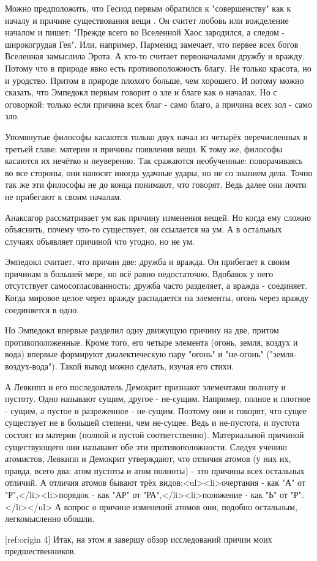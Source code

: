 \documentclass{article}
\begin{document}
Можно предположить, что Гесиод первым обратился к "совершенству" как к началу и причине существования вещи
\footnotemark[1]
. Он считет любовь или вожделение началом и пишет: "Прежде всего во Вселенной Хаос зародился, а следом - широкогрудая Гея". Или, например, Парменид замечает, что первее всех богов Вселенная замыслила Эрота. А кто-то считает первоначалами дружбу и вражду. Потому что в природе явно есть противоположность благу. Не только красота, но и уродство. Притом в природе плохого больше, чем хорошего. И потому можно сказать, что Эмпедокл первым говорит о зле и благе как о началах. Но с оговоркой: только если причина всех благ - само благо, а причина всех зол - само зло.

Упомянутые философы касаются только двух начал из четырёх перечисленных в третьей главе: материи и причины появления вещи. К тому же, философы касаются их нечётко и неуверенно. Так сражаются необученные: поворачиваясь во все стороны, они наносят иногда удачные удары, но не со знанием дела. Точно так же эти философы не до конца понимают, что говорят. Ведь далее они почти не прибегают к своим началам.

Анаксагор рассматривает ум как причину изменения вещей. Но когда ему сложно объяснить, почему что-то существует, он ссылается на ум. А в остальных случаях объявляет причиной что угодно, но не ум.

Эмпедокл считает, что причин две: дружба и вражда.
\footnotemark[2]
Он прибегает к своим причинам в большей мере, но всё равно недостаточно. Вдобавок у него отсутствует самосогласованность: дружба часто разделяет, а вражда - соединяет. Когда мировое целое через вражду распадается на элементы, огонь через вражду соединяется в одно.

Но Эмпедокл впервые разделил одну движущую причину на две, притом противоположенные. Кроме того, его четыре элемента (огонь, земля, воздух и вода) впервые формируют диалектическую пару "огонь" и "не-огонь" ("земля-воздух-вода"). Такой вывод можно сделать, изучая его стихи.

А Левкипп и его последователь Демокрит признают элементами полноту и пустоту. Одно называют сущим, другое - не-сущим. Например, полное и плотное - сущим, а пустое и разреженное - не-сущим. Поэтому они и говорят, что сущее существует не в большей степени, чем не-сущее. Ведь и не-пустота, и пустота состоят из материи (полной и пустой соответственно). Материальной причиной существующего они называют обе эти противоположности. Следуя учению атомистов, Левкипп и Демокрит утверждают, что отличия атомов (у них их, правда, всего два: атом пустоты и атом полноты) - это причины всех остальных отличий. А отличия атомов бывают трёх видов:<ul><li>очертания - как "А" от "Р",</li><li>порядок - как "АР" от "РА",</li><li>положение - как "Ь" от "Р".</li></ul> А вопрос о причине изменений атомов они, подобно остальным, легкомысленно обошли.

[ref:origin 4]
Итак, на этом я завершу обзор исследований причин моих предшественников.
\end{document}
